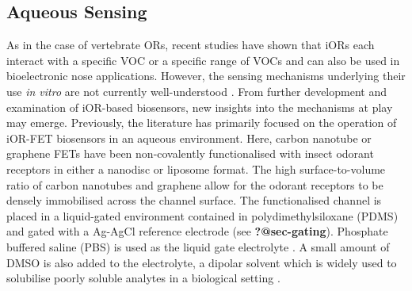 \documentclass[
  a4paper,
]{scrbook}
\begin{document}
\hypertarget{aqueous-sensing}{%
\subsection{Aqueous Sensing}\label{aqueous-sensing}}

As in the case of vertebrate ORs, recent studies have shown that iORs
each interact with a specific VOC or a specific range of VOCs and can
also be used in bioelectronic nose applications. However, the sensing
mechanisms underlying their use \emph{in vitro} are not currently
well-understood \autocite{Murugathas2019a,Murugathas2020,Khadka2019}.
From further development and examination of iOR-based biosensors, new
insights into the mechanisms at play may emerge. Previously, the
literature has primarily focused on the operation of iOR-FET biosensors
in an aqueous environment. Here, carbon nanotube or graphene FETs have
been non-covalently functionalised with insect odorant receptors in
either a nanodisc or liposome format. The high surface-to-volume ratio
of carbon nanotubes and graphene allow for the odorant receptors to be
densely immobilised across the channel surface. The functionalised
channel is placed in a liquid-gated environment contained in
polydimethylsiloxane (PDMS) and gated with a Ag-AgCl reference electrode
(see \textbf{?@sec-gating}). Phosphate buffered saline (PBS) is used as
the liquid gate electrolyte \autocite{Murugathas2019a,Murugathas2020}. A
small amount of DMSO is also added to the electrolyte, a dipolar solvent
which is widely used to solubilise poorly soluble analytes in a
biological setting \autocite{Galvao2014}.
\end{document}
